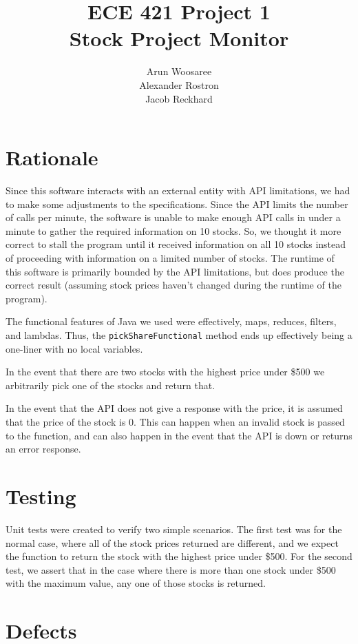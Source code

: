 \documentclass[letterpaper]{article}
\title{ECE 421 Project 1\\
Stock Project Monitor}
\author{Arun Woosaree\\
Alexander Rostron\\
Jacob Reckhard
}
\begin{document}
\maketitle %

\section{Rationale}
Since this software interacts with an external entity with API
limitations, we had to make some adjustments to the
specifications. Since the API limits the number of calls per minute,
the software is unable to make enough API calls in under a
minute to gather the required information on 10 stocks. So, we thought
it more correct to stall the program until it received information on
all 10 stocks instead of proceeding with information on a limited
number of stocks. The runtime of this software is primarily bounded by
the API limitations, but does produce the correct result (assuming
stock prices haven't changed during the runtime of the program).

The functional features of Java we used were effectively, maps,
reduces, filters, and lambdas. Thus, the \texttt{pickShareFunctional} method
ends up effectively being a one-liner with no local variables.

In the event that there are two stocks with the highest price under \$500 we
arbitrarily pick one of the stocks and return that.

In the event that the API does not give a response with the price, it is assumed
that the price of the stock is 0. This can happen when an invalid stock is
passed to the function, and can also happen in the event that the API is down or
returns an error response.

\section{Testing}
Unit tests were created to verify two simple scenarios. The first test was for
the normal case, where all of the stock prices returned are different, and we
expect the function to return the stock with the highest price under \$500. For
the second test, we assert that in the case where there is more than one
stock under \$500 with the maximum value, any one of those stocks is returned. 

\section{Defects}
\end{document}
